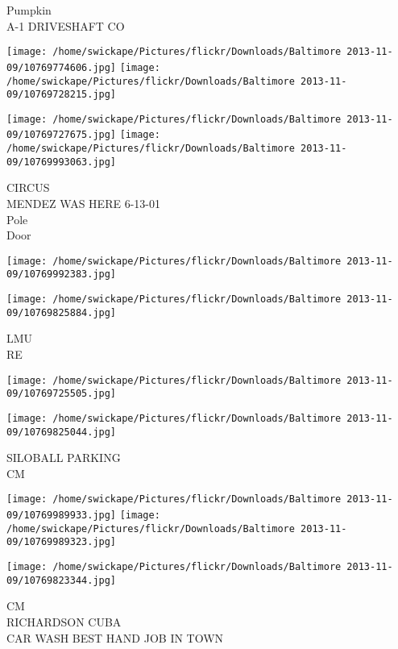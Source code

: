 \documentclass[10pt,letterpaper]{article}
\begin{document}
Pumpkin\\
A{-}1 DRIVESHAFT CO\\
\pagebreak

\texttt{[image: /home/swickape/Pictures/flickr/Downloads/Baltimore 2013-11-09/10769774606.jpg]}
\texttt{[image: /home/swickape/Pictures/flickr/Downloads/Baltimore 2013-11-09/10769728215.jpg]}

\texttt{[image: /home/swickape/Pictures/flickr/Downloads/Baltimore 2013-11-09/10769727675.jpg]}
\texttt{[image: /home/swickape/Pictures/flickr/Downloads/Baltimore 2013-11-09/10769993063.jpg]}

CIRCUS\\
MENDEZ WAS HERE 6{-}13{-}01\\
Pole\\
Door\\
\pagebreak

\texttt{[image: /home/swickape/Pictures/flickr/Downloads/Baltimore 2013-11-09/10769992383.jpg]}

\vspace{0.25in}
\texttt{[image: /home/swickape/Pictures/flickr/Downloads/Baltimore 2013-11-09/10769825884.jpg]}

LMU\\
RE\\
\pagebreak

\texttt{[image: /home/swickape/Pictures/flickr/Downloads/Baltimore 2013-11-09/10769725505.jpg]}

\vspace{0.25in}
\texttt{[image: /home/swickape/Pictures/flickr/Downloads/Baltimore 2013-11-09/10769825044.jpg]}

SILOBALL PARKING\\
CM\\
\pagebreak

\texttt{[image: /home/swickape/Pictures/flickr/Downloads/Baltimore 2013-11-09/10769989933.jpg]}
\texttt{[image: /home/swickape/Pictures/flickr/Downloads/Baltimore 2013-11-09/10769989323.jpg]}

\texttt{[image: /home/swickape/Pictures/flickr/Downloads/Baltimore 2013-11-09/10769823344.jpg]}

CM\\
RICHARDSON CUBA\\
CAR WASH BEST HAND JOB IN TOWN\\
\pagebreak
\end{document}
